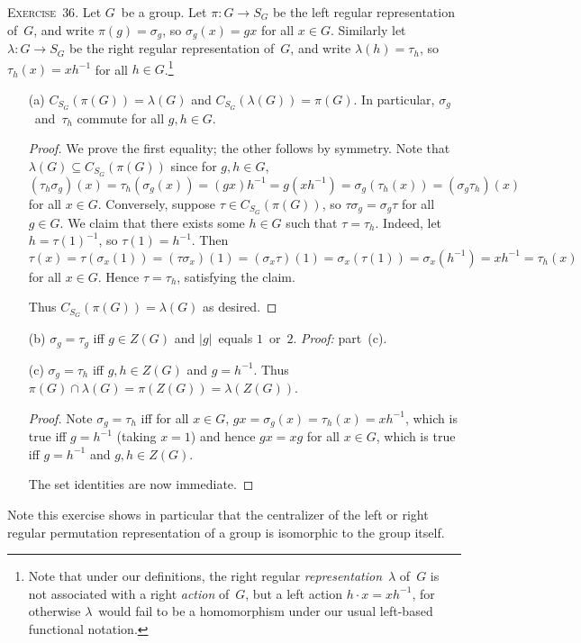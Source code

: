 \documentclass[letterpaper]{article}
\newcommand{\exercise}[1]{\goodbreak\noindent\textsc{Exercise~{#1}.}}
\newcommand{\sect}{\cap}
\newcommand{\ord}[1]{|{#1}|}
\begin{document}
\exercise{36}
Let $G$~be a group. Let $\pi:G\to S_G$ be the left regular representation of~$G$, and write $\pi(g)=\sigma_g$, so $\sigma_g(x)=gx$ for all $x\in G$. Similarly let $\lambda:G\to S_G$ be the right regular representation of~$G$, and write $\lambda(h)=\tau_h$, so $\tau_h(x)=xh^{-1}$ for all $h\in G$.\footnote{Note that under our definitions, the right regular \emph{representation}~$\lambda$ of~$G$ is not associated with a right \emph{action} of~$G$, but a left action $h\cdot x=xh^{-1}$, for otherwise $\lambda$~would fail to be a homomorphism under our usual left-based functional notation.}
\begin{enumerate}[itemsep=0pt]
\item[(a)] $C_{S_G}(\pi(G))=\lambda(G)$ and $C_{S_G}(\lambda(G))=\pi(G)$. In particular, $\sigma_g$~and~$\tau_h$ commute for all $g,h\in G$.
\begin{proof}
We prove the first equality; the other follows by symmetry. Note that $\lambda(G)\subseteq C_{S_G}(\pi(G))$ since for $g,h\in G$,
$$(\tau_h\sigma_g)(x)=\tau_h(\sigma_g(x))=(gx)h^{-1}=g(xh^{-1})=\sigma_g(\tau_h(x))=(\sigma_g\tau_h)(x)$$
for all $x\in G$. Conversely, suppose $\tau\in C_{S_G}(\pi(G))$, so $\tau\sigma_g=\sigma_g\tau$ for all $g\in G$. We claim that there exists some $h\in G$ such that $\tau=\tau_h$. Indeed, let $h=\tau(1)^{-1}$, so $\tau(1)=h^{-1}$. Then
$$\tau(x)=\tau(\sigma_x(1))=(\tau\sigma_x)(1)=(\sigma_x\tau)(1)=\sigma_x(\tau(1))=\sigma_x(h^{-1})=xh^{-1}=\tau_h(x)$$
for all $x\in G$. Hence $\tau=\tau_h$, satisfying the claim.

Thus $C_{S_G}(\pi(G))=\lambda(G)$ as desired.
\end{proof}
\item[(b)] $\sigma_g=\tau_g$ iff $g\in Z(G)$ and $\ord{g}$~equals $1$~or~$2$. \emph{Proof:} part~(c).
\item[(c)] $\sigma_g=\tau_h$ iff $g,h\in Z(G)$ and $g=h^{-1}$. Thus $\pi(G)\sect\lambda(G)=\pi(Z(G))=\lambda(Z(G))$.
\begin{proof}
Note $\sigma_g=\tau_h$ iff for all $x\in G$, $gx=\sigma_g(x)=\tau_h(x)=xh^{-1}$, which is true iff $g=h^{-1}$ (taking $x=1$) and hence $gx=xg$ for all $x\in G$, which is true iff $g=h^{-1}$ and $g,h\in Z(G)$.

The set identities are now immediate.
\end{proof}
\end{enumerate}
\noindent Note this exercise shows in particular that the centralizer of the left or right regular permutation representation of a group is isomorphic to the group itself.
\end{document}
